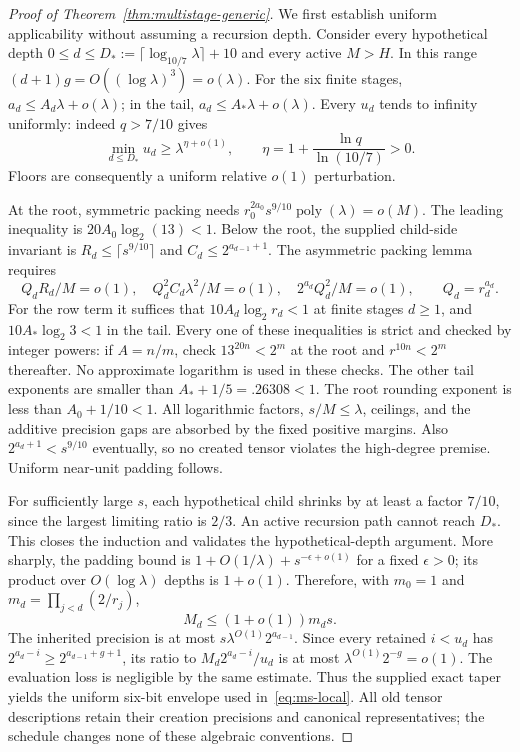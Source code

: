 \begin{proof}[Proof of Theorem~\ref{thm:multistage-generic}]
We first establish uniform applicability without assuming a recursion depth.
Consider every hypothetical depth
$0\le d\le D_*:=\lceil\log_{10/7}\lambda\rceil+10$ and every active
$M>H$. In this range $(d+1)g=O((\log\lambda)^3)=o(\lambda)$.
For the six finite stages, $a_d\le A_d\lambda+o(\lambda)$; in the tail,
$a_d\le A_*\lambda+o(\lambda)$. Every $u_d$ tends to infinity uniformly:
indeed $q>7/10$ gives
\[
 \min_{d\le D_*}u_d\ge\lambda^{\eta+o(1)},\qquad
 \eta=1+\frac{\ln q}{\ln(10/7)}>0.
\]
Floors are consequently a uniform relative $o(1)$ perturbation.

At the root, symmetric packing needs
$r_0^{2a_0}s^{9/10}\operatorname{poly}(\lambda)=o(M)$.
The leading inequality is
$20A_0\log_2(13)<1$. Below the root, the supplied child-side invariant
is $R_d\le\lceil s^{9/10}\rceil$ and $C_d\le2^{a_{d-1}+1}$.
The asymmetric packing lemma requires
\[
 Q_d R_d/M=o(1),\quad
 Q_d^2 C_d\lambda^2/M=o(1),\quad
 2^{a_d}Q_d^2/M=o(1),\qquad Q_d=r_d^{a_d}.
\]
For the row term it suffices that $10A_d\log_2r_d<1$ at finite stages
$d\ge1$, and $10A_*\log_2 3<1$ in the tail. Every one of these
inequalities is strict and checked by integer powers: if $A=n/m$,
check $13^{20n}<2^m$ at the root and $r^{10n}<2^m$ thereafter.
No approximate logarithm is used in these checks. The other tail exponents
are smaller than $A_*+1/5=.26308<1$. The root rounding exponent is less
than $A_0+1/10<1$. All logarithmic factors, $s/M\le\lambda$, ceilings,
and the additive precision gaps are absorbed by the fixed positive margins.
Also $2^{a_d+1}<s^{9/10}$ eventually, so no created tensor violates the
high-degree premise. Uniform near-unit padding follows.

For sufficiently large $s$, each hypothetical child shrinks by at least a
factor $7/10$, since the largest limiting ratio is $2/3$.
An active recursion path cannot reach $D_*$. This closes the induction and
validates the hypothetical-depth argument. More sharply, the padding bound
is $1+O(1/\lambda)+s^{-\epsilon+o(1)}$ for a fixed $\epsilon>0$;
its product over $O(\log\lambda)$ depths is $1+o(1)$. Therefore, with
$m_0=1$ and $m_d=\prod_{j<d}(2/r_j)$,
\[
 M_d\le(1+o(1))m_ds.
\]
The inherited precision is at most
$s\lambda^{O(1)}2^{a_{d-1}}$. Since every retained $i<u_d$ has
$2^{a_d-i}\ge2^{a_{d-1}+g+1}$, its ratio to
$M_d2^{a_d-i}/u_d$ is at most $\lambda^{O(1)}2^{-g}=o(1)$.
The evaluation loss is negligible by the same estimate. Thus the supplied
exact taper yields the uniform six-bit envelope used in~\eqref{eq:ms-local}.
All old tensor descriptions retain their creation precisions and canonical
representatives; the schedule changes none of these algebraic conventions.


\end{proof}
